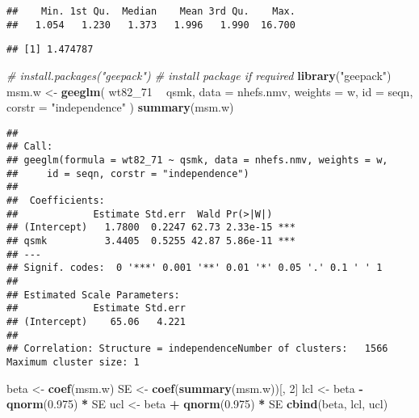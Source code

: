 \documentclass[10pt,]{book}
\newenvironment{Shaded}{\begin{snugshade}}{\end{snugshade}}
\newcommand{\CommentTok}[1]{\textcolor[rgb]{0.56,0.35,0.01}{\textit{#1}}}
\newcommand{\DataTypeTok}[1]{\textcolor[rgb]{0.13,0.29,0.53}{#1}}
\newcommand{\DecValTok}[1]{\textcolor[rgb]{0.00,0.00,0.81}{#1}}
\newcommand{\FloatTok}[1]{\textcolor[rgb]{0.00,0.00,0.81}{#1}}
\newcommand{\KeywordTok}[1]{\textcolor[rgb]{0.13,0.29,0.53}{\textbf{#1}}}
\newcommand{\NormalTok}[1]{#1}
\newcommand{\OperatorTok}[1]{\textcolor[rgb]{0.81,0.36,0.00}{\textbf{#1}}}
\newcommand{\StringTok}[1]{\textcolor[rgb]{0.31,0.60,0.02}{#1}}
\begin{document}
\begin{verbatim}
##    Min. 1st Qu.  Median    Mean 3rd Qu.    Max. 
##   1.054   1.230   1.373   1.996   1.990  16.700
\end{verbatim}

\begin{Shaded}
\end{Shaded}

\begin{verbatim}
## [1] 1.474787
\end{verbatim}

\begin{Shaded}
\begin{Highlighting}[]
\CommentTok{# install.packages("geepack") # install package if required}
\KeywordTok{library}\NormalTok{(}\StringTok{"geepack"}\NormalTok{)}
\NormalTok{msm.w <-}\StringTok{ }\KeywordTok{geeglm}\NormalTok{(}
\NormalTok{  wt82_}\DecValTok{71} \OperatorTok{~}\StringTok{ }\NormalTok{qsmk,}
  \DataTypeTok{data =}\NormalTok{ nhefs.nmv,}
  \DataTypeTok{weights =}\NormalTok{ w,}
  \DataTypeTok{id =}\NormalTok{ seqn,}
  \DataTypeTok{corstr =} \StringTok{"independence"}
\NormalTok{)}
\KeywordTok{summary}\NormalTok{(msm.w)}
\end{Highlighting}
\end{Shaded}

\begin{verbatim}
## 
## Call:
## geeglm(formula = wt82_71 ~ qsmk, data = nhefs.nmv, weights = w, 
##     id = seqn, corstr = "independence")
## 
##  Coefficients:
##             Estimate Std.err  Wald Pr(>|W|)    
## (Intercept)   1.7800  0.2247 62.73 2.33e-15 ***
## qsmk          3.4405  0.5255 42.87 5.86e-11 ***
## ---
## Signif. codes:  0 '***' 0.001 '**' 0.01 '*' 0.05 '.' 0.1 ' ' 1
## 
## Estimated Scale Parameters:
##             Estimate Std.err
## (Intercept)    65.06   4.221
## 
## Correlation: Structure = independenceNumber of clusters:   1566   Maximum cluster size: 1
\end{verbatim}

\begin{Shaded}
\begin{Highlighting}[]
\NormalTok{beta <-}\StringTok{ }\KeywordTok{coef}\NormalTok{(msm.w)}
\NormalTok{SE <-}\StringTok{ }\KeywordTok{coef}\NormalTok{(}\KeywordTok{summary}\NormalTok{(msm.w))[, }\DecValTok{2}\NormalTok{]}
\NormalTok{lcl <-}\StringTok{ }\NormalTok{beta }\OperatorTok{-}\StringTok{ }\KeywordTok{qnorm}\NormalTok{(}\FloatTok{0.975}\NormalTok{) }\OperatorTok{*}\StringTok{ }\NormalTok{SE}
\NormalTok{ucl <-}\StringTok{ }\NormalTok{beta }\OperatorTok{+}\StringTok{ }\KeywordTok{qnorm}\NormalTok{(}\FloatTok{0.975}\NormalTok{) }\OperatorTok{*}\StringTok{ }\NormalTok{SE}
\KeywordTok{cbind}\NormalTok{(beta, lcl, ucl)}
\end{Highlighting}
\end{Shaded}
\end{document}
